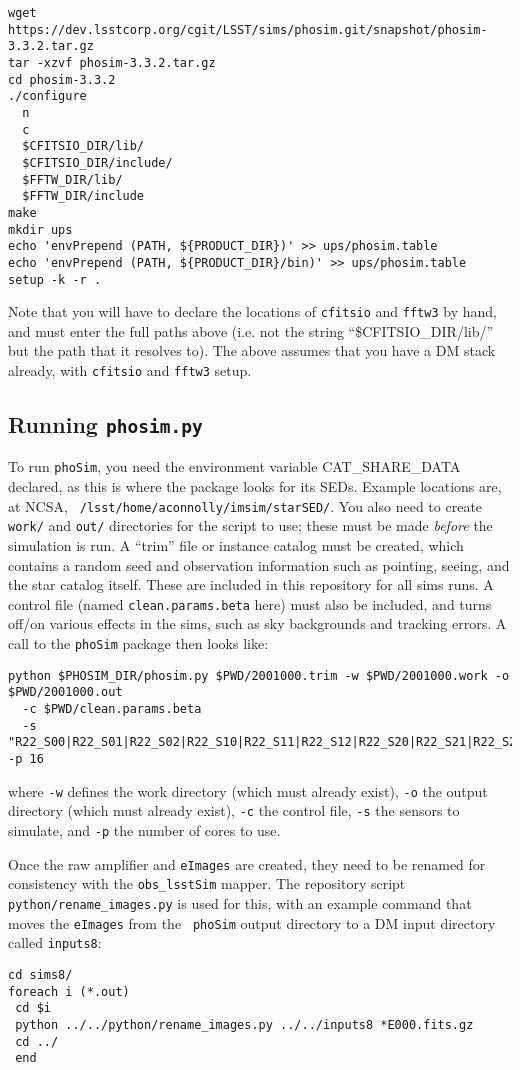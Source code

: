 \documentclass[prd, nofootinbib, floatfix, 11pt, tightenlines, times]{article}
\begin{document}
\begin{appendices}
{\small
\begin{Verbatim}[frame=single]
wget https://dev.lsstcorp.org/cgit/LSST/sims/phosim.git/snapshot/phosim-3.3.2.tar.gz
tar -xzvf phosim-3.3.2.tar.gz
cd phosim-3.3.2
./configure
  n
  c
  $CFITSIO_DIR/lib/
  $CFITSIO_DIR/include/
  $FFTW_DIR/lib/
  $FFTW_DIR/include
make
mkdir ups
echo 'envPrepend (PATH, ${PRODUCT_DIR})' >> ups/phosim.table
echo 'envPrepend (PATH, ${PRODUCT_DIR}/bin)' >> ups/phosim.table
setup -k -r .
\end{Verbatim}
}  

Note that you will have to declare the locations of {\tt cfitsio} and
{\tt fftw3} by hand, and must enter the full paths above (i.e. not the
string ``\$CFITSIO\_DIR/lib/'' but the path that it resolves to).  The
above assumes that you have a DM stack already, with {\tt cfitsio} and
{\tt fftw3} setup.

\subsection{Running {\tt phosim.py}}

To run {\tt phoSim}, you need the environment variable
CAT\_SHARE\_DATA declared, as this is where the package looks for its
SEDs.  Example locations are, at NCSA, {\tt
  /lsst/home/aconnolly/imsim/starSED/}.  You also need to create {\tt
  work/} and {\tt out/} directories for the script to use; these must
be made {\it before} the simulation is run.  A ``trim'' file or
instance catalog must be created, which contains a random seed and
observation information such as pointing, seeing, and the star catalog
itself.  These are included in this repository for all sims runs.  A
control file (named {\tt clean.params.beta} here) must also be
included, and turns off/on various effects in the sims, such as sky
backgrounds and tracking errors.  A call to the {\tt phoSim} package
then looks like: 

{\small
\begin{Verbatim}[frame=single]
python $PHOSIM_DIR/phosim.py $PWD/2001000.trim -w $PWD/2001000.work -o $PWD/2001000.out 
  -c $PWD/clean.params.beta 
  -s "R22_S00|R22_S01|R22_S02|R22_S10|R22_S11|R22_S12|R22_S20|R22_S21|R22_S22" -p 16
\end{Verbatim}
} 
where {\tt -w} defines the work directory (which must already exist),
{\tt -o} the output directory (which must already exist), {\tt -c} the
control file, {\tt -s} the sensors to simulate, and {\tt -p} the
number of cores to use.


Once the raw amplifier and {\tt eImages} are created, they need to be
renamed for consistency with the {\tt obs\_lsstSim} mapper.  The
repository script {\tt python/rename\_images.py} is used for this,
with an example command that moves the {\tt eImages} from the {\tt
  phoSim} output directory to a DM input directory called {\tt inputs8}:
{\small
\begin{Verbatim}[frame=single]
cd sims8/
foreach i (*.out)
 cd $i
 python ../../python/rename_images.py ../../inputs8 *E000.fits.gz
 cd ../ 
 end
\end{Verbatim}
}


\end{appendices}
\end{document}
